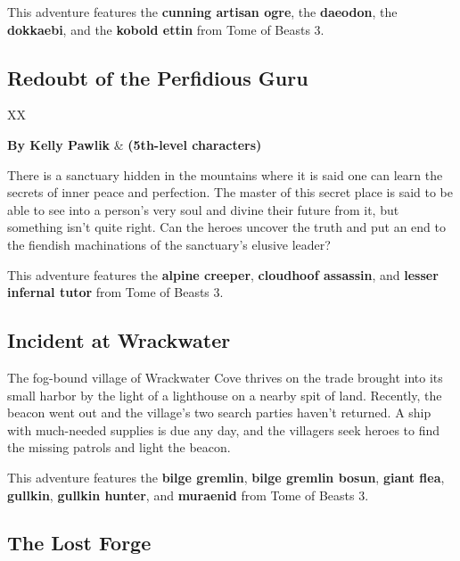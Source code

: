 \documentclass[10pt,a4paper,twoside,bg=print,twocolumn,openany,nodeprecatedcode]{dndbook}
\begin{document}
This adventure features the \textbf{cunning artisan ogre}, the \textbf{daeodon}, the \textbf{dokkaebi}, and the \textbf{kobold ettin} from Tome of Beasts 3.

\subsection{Redoubt of the Perfidious Guru}

\begin{DndTable}{XX}

\textbf{By Kelly Pawlik} & \textbf{(5th-level characters)}\\
\end{DndTable}

There is a sanctuary hidden in the mountains where it is said one can learn the secrets of inner peace and perfection. The master of this secret place is said to be able to see into a person's very soul and divine their future from it, but something isn't quite right. Can the heroes uncover the truth and put an end to the fiendish machinations of the sanctuary's elusive leader?

This adventure features the \textbf{alpine creeper}, \textbf{cloudhoof assassin}, and \textbf{lesser infernal tutor} from Tome of Beasts 3.

\subsection{Incident at Wrackwater}

\begin{DndTable}{XX}

\textbf{By Robert Fairbanks} & \textbf{(6th-level says 5th-level.} characters)}\\
\end{DndTable}

The fog-bound village of Wrackwater Cove thrives on the trade brought into its small harbor by the light of a lighthouse on a nearby spit of land. Recently, the beacon went out and the village's two search parties haven't returned. A ship with much-needed supplies is due any day, and the villagers seek heroes to find the missing patrols and light the beacon.

This adventure features the \textbf{bilge gremlin}, \textbf{bilge gremlin bosun}, \textbf{giant flea}, \textbf{gullkin}, \textbf{gullkin hunter}, and \textbf{muraenid} from Tome of Beasts 3.

\subsection{The Lost Forge}
\end{document}
